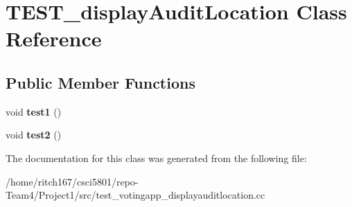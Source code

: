 \hypertarget{classTEST__displayAuditLocation}{}\section{T\+E\+S\+T\+\_\+display\+Audit\+Location Class Reference}
\label{classTEST__displayAuditLocation}
\subsection*{Public Member Functions}
\begin{DoxyCompactItemize}
\item 
\mbox{\label{classTEST__displayAuditLocation_a727c40536bf0cadff7bf5794c9421b1b}} 
void {\bfseries test1} ()
\item 
\mbox{\label{classTEST__displayAuditLocation_a221e0590fb0c5c8f8f4ada65e5c9073b}} 
void {\bfseries test2} ()
\end{DoxyCompactItemize}


The documentation for this class was generated from the following file\+:\begin{DoxyCompactItemize}
\item 
/home/ritch167/csci5801/repo-\/\+Team4/\+Project1/src/test\+\_\+votingapp\+\_\+displayauditlocation.\+cc\end{DoxyCompactItemize}
